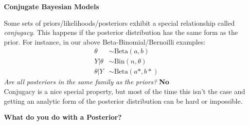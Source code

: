 \documentclass[12pt,xcolor=svgnames]{beamer}
\newcommand{\rd}{\color{red}}
\newcommand{\bl}{\color{blue}}
\newcommand{\theme}{\color{FireBrick}}
\newcommand{\mr}[1]{\mathrm{#1}}
\newcommand{\sk}{\vspace{.4cm}}
\newcommand{\chap}[1]{{\theme \Large \bf #1} \sk}
\begin{document}
\fi

\begin{frame}
\chap{Conjugate Bayesian Models}

Some sets of priors/likelihoods/posteriors exhibit a special relationship called {\em \bl conjugacy}. This happens if the posterior distribution has the same form as the prior. For instance, in our above Beta-Binomial/Bernoilli examples:
\begin{align*}
\theta & \sim \mr{Beta} (a,b)\\
Y|\theta &  \sim \mr{Bin} (n, \theta)\\
\theta | Y & \sim \mr{Beta}(a*, b*)
\end{align*}
{\em Are all posteriors in the same family as the priors?} {\rd \bf No}\\

Conjugacy is a nice special property, but most of the time this isn't the case and getting an analytic form of the posterior distribution can be hard or impossible.  

\end{frame}

\begin{frame}
\chap{What do you do with a Posterior?}


\end{frame}
\end{document}
